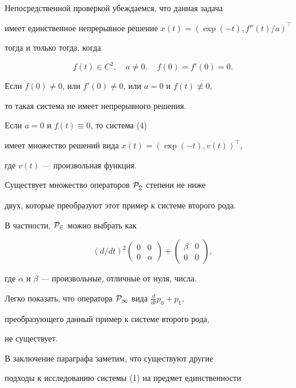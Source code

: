 Непосредственной проверкой убеждаемся, что данная задача 


имеет единственное непрерывное решение $x(t)=(\exp(-t),f''(t)/a)^\top$ 


тогда и только тогда, когда 


$$ 


f(t)\in C^2,\quad a\ne 0,\quad f(0)=f'(0)=0. 


$$ 


 


Если $f(0)\ne 0$, или $f'(0)\ne 0$, или $a=0$ и $f(t)\not\equiv 0$, 


то такая система не имеет непрерывного решения. 


 


Если $a=0$ и $f(t)\equiv 0$, то система (4) 


имеет множество решений вида $x(t)=(\exp(-t),v(t))^\top$, 


где $v(t)$ --- произвольная функция. 


 


Существует множество операторов $\cal P_m$ степени не ниже 


двух, которые преобразуют этот пример к системе второго рода. 


В частности, $\cal P_2$ можно выбрать как 


$$ 


(d/dt)^2\begin{pmatrix}0 & 0 \\ 0 & \alpha \end{pmatrix}+ 


\begin{pmatrix} \beta & 0 \\ 0 & 0 \end{pmatrix}, 


$$ 


где $\alpha$ и $\beta$ --- произвольные, отличные от нуля, числа. 


Легко показать, что оператора $\cal P_1$ вида $\frac{d}{dt}p_0+p_1$, 


преобразующего данный пример к системе второго рода, 


не существует. 


 


В заключение параграфа заметим, что существуют другие 


подходы к исследованию системы (1) на предмет единственности 


